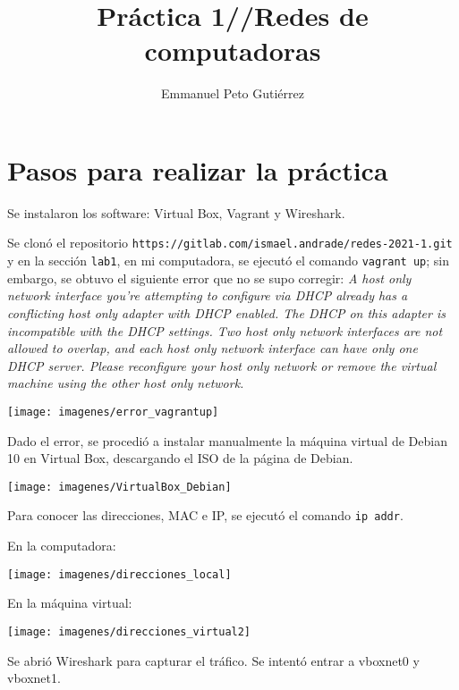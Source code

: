 \documentclass{article}
\title{Práctica 1//Redes de computadoras}
\author{Emmanuel Peto Gutiérrez}
\begin{document}
\maketitle

\section{Pasos para realizar la práctica}

Se instalaron los software: Virtual Box, Vagrant y Wireshark.

Se clonó el repositorio \texttt{https://gitlab.com/ismael.andrade/redes-2021-1.git} y en la sección \texttt{lab1}, en mi computadora, se ejecutó el comando \texttt{vagrant up}; sin embargo, se obtuvo el siguiente error que no se supo corregir: \textit{A host only network interface you're attempting to configure via DHCP already has a conflicting host only adapter with DHCP enabled. The DHCP on this adapter is incompatible with the DHCP settings. Two host only network interfaces are not allowed to overlap, and each host only network interface can have only one DHCP server. Please reconfigure your host only network or remove the virtual machine using the other host only network.}

\begin{center}
\texttt{[image: imagenes/error\_vagrantup]}
\end{center}

Dado el error, se procedió a instalar manualmente la máquina virtual de Debian 10 en Virtual Box, descargando el ISO de la página de Debian.

\begin{center}
\texttt{[image: imagenes/VirtualBox\_Debian]}
\end{center}

Para conocer las direcciones, MAC e IP, se ejecutó el comando \texttt{ip addr}.

En la computadora:

\begin{center}
\texttt{[image: imagenes/direcciones\_local]}
\end{center}

En la máquina virtual:

\begin{center}
\texttt{[image: imagenes/direcciones\_virtual2]}
\end{center}

Se abrió Wireshark para capturar el tráfico. Se intentó entrar a vboxnet0 y vboxnet1.
\end{document}
